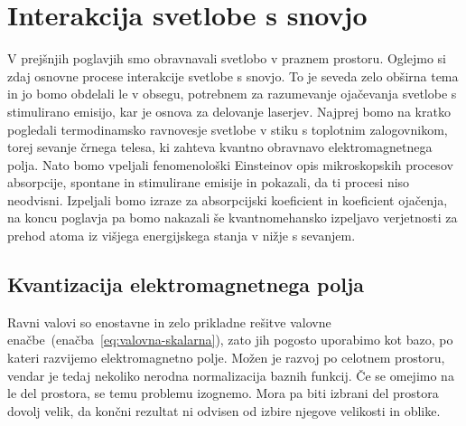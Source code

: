 \chapter{Interakcija svetlobe s snovjo}

V prejšnjih poglavjih smo obravnavali svetlobo v praznem prostoru. Oglejmo si
zdaj osnovne procese interakcije svetlobe s snovjo. To je seveda zelo
obširna tema in jo bomo obdelali le v obsegu, potrebnem za
razumevanje ojačevanja svetlobe s stimulirano emisijo, kar je osnova za
delovanje laserjev. Najprej bomo na kratko pogledali termodinamsko ravnovesje 
svetlobe v stiku s toplotnim zalogovnikom, torej sevanje črnega telesa, ki 
zahteva kvantno obravnavo elektromagnetnega polja. Nato bomo vpeljali fenomenološki
Einsteinov opis mikroskopskih procesov absorpcije, spontane in stimulirane
emisije in pokazali, da ti procesi niso neodvisni. Izpeljali bomo
izraze za absorpcijski koeficient in koeficient ojačenja, na koncu poglavja
pa bomo nakazali še kvantnomehansko izpeljavo verjetnosti za prehod
atoma iz višjega energijskega stanja v nižje s sevanjem.

\section{Kvantizacija elektromagnetnega polja}
Ravni valovi so enostavne in zelo prikladne rešitve valovne 
enačbe~(enačba~\ref{eq:valovna-skalarna}), zato jih pogosto uporabimo kot 
bazo, po kateri razvijemo elektromagnetno polje. Možen je razvoj
po celotnem prostoru, vendar je tedaj nekoliko nerodna normalizacija baznih
funkcij. Če se omejimo na le del prostora, se temu problemu izognemo. Mora pa biti 
izbrani del prostora dovolj velik, da končni rezultat ni odvisen od izbire 
njegove velikosti in oblike.

